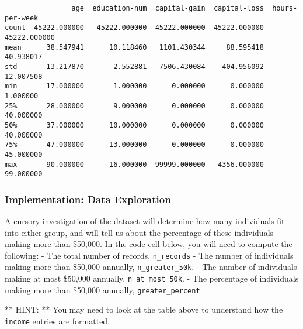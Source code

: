 \documentclass[11pt]{article}
\begin{document}
    
    
    \begin{verbatim}
                age  education-num  capital-gain  capital-loss  hours-per-week
count  45222.000000   45222.000000  45222.000000  45222.000000    45222.000000
mean      38.547941      10.118460   1101.430344     88.595418       40.938017
std       13.217870       2.552881   7506.430084    404.956092       12.007508
min       17.000000       1.000000      0.000000      0.000000        1.000000
25%       28.000000       9.000000      0.000000      0.000000       40.000000
50%       37.000000      10.000000      0.000000      0.000000       40.000000
75%       47.000000      13.000000      0.000000      0.000000       45.000000
max       90.000000      16.000000  99999.000000   4356.000000       99.000000
    \end{verbatim}

    
    \subsubsection{Implementation: Data
Exploration}\label{implementation-data-exploration}

A cursory investigation of the dataset will determine how many
individuals fit into either group, and will tell us about the percentage
of these individuals making more than \$50,000. In the code cell below,
you will need to compute the following: - The total number of records,
\texttt{\textquotesingle{}n\_records\textquotesingle{}} - The number of
individuals making more than \$50,000 annually,
\texttt{\textquotesingle{}n\_greater\_50k\textquotesingle{}}. - The
number of individuals making at most \$50,000 annually,
\texttt{\textquotesingle{}n\_at\_most\_50k\textquotesingle{}}. - The
percentage of individuals making more than \$50,000 annually,
\texttt{\textquotesingle{}greater\_percent\textquotesingle{}}.

** HINT: ** You may need to look at the table above to understand how
the \texttt{\textquotesingle{}income\textquotesingle{}} entries are
formatted.
\end{document}
